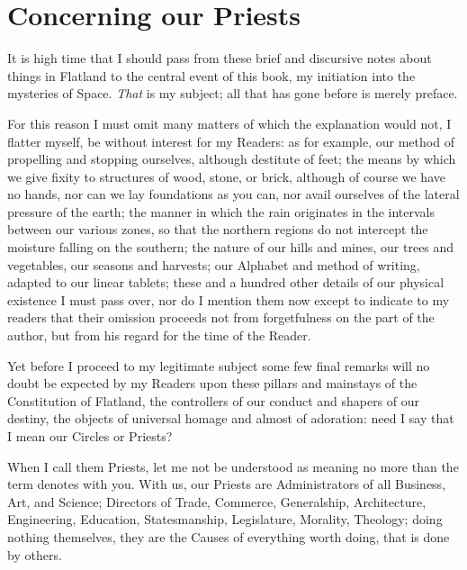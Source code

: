 \documentclass[10pt, kindle, oneside]{kindle}
\begin{document}
\chapter{Concerning our Priests}


It is high time that I should pass from these brief and discursive notes about
things in Flatland to the central event of this book, my initiation into the
mysteries of Space. \emph{That} is my subject; all that has gone before is merely
preface.

For this reason I must omit many matters of which the explanation would not, I
flatter myself, be without interest for my Readers: as for example, our method
of propelling and stopping ourselves, although destitute of feet; the means by
which we give fixity to structures of wood, stone, or brick, although of
course we have no hands, nor can we lay foundations as you can, nor avail
ourselves of the lateral pressure of the earth; the manner in which the rain
originates in the intervals between our various zones, so that the northern
regions do not intercept the moisture falling on the southern; the nature of
our hills and mines, our trees and vegetables, our seasons and harvests; our
Alphabet and method of writing, adapted to our linear tablets; these and a
hundred other details of our physical existence I must pass over, nor do I
mention them now except to indicate to my readers that their omission proceeds
not from forgetfulness on the part of the author, but from his regard for the
time of the Reader.

Yet before I proceed to my legitimate subject some few final remarks will no
doubt be expected by my Readers upon these pillars and mainstays of the
Constitution of Flatland, the controllers of our conduct and shapers of our
destiny, the objects of universal homage and almost of adoration: need I say
that I mean our Circles or Priests?

When I call them Priests, let me not be understood as meaning no more than the
term denotes with you. With us, our Priests are Administrators of all
Business, Art, and Science; Directors of Trade, Commerce, Generalship,
Architecture, Engineering, Education, Statesmanship, Legislature, Morality,
Theology; doing nothing themselves, they are the Causes of everything worth
doing, that is done by others.
\end{document}
